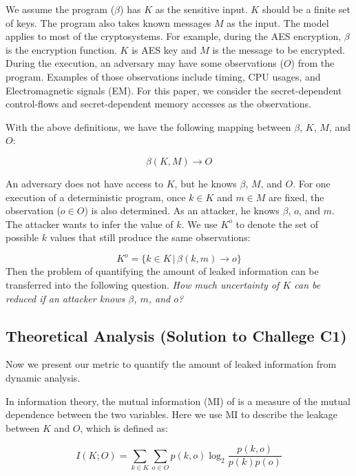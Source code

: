 We assume the program ($\beta$) has $K$ as the sensitive input. 
$K$ should be a finite set of keys. The program also takes known messages $M$ as the input. 
The model applies to most of the cryptosystems. For example,
during the AES encryption, $\beta$ is the encryption function. $K$ is AES key and
$M$ is the message to be encrypted. During the execution, an adversary may have some observations ($O$) from the program. Examples of those observations
include timing, CPU usages, and Electromagnetic signals (EM). For this paper, we
consider the secret-dependent control-flows and secret-dependent memory accesses
as the observations.

With the above definitions, we have the following mapping between $\beta$, $K$, $M$, and $O$:

\begin{displaymath}
    \beta(K, M) \rightarrow O
\end{displaymath}

An adversary does not have access to $K$, but he knows $\beta$, $M$, and $O$. 
For one execution of a deterministic program, once $k \in K$ and $m \in M$ are fixed, the 
observation ($o \in O$) is also determined. As an attacker, he knows $\beta$, $o$, 
and $m$. The attacker wants to infer the value of $k$. We use $K^o$ to denote the set of
possible $k$ values that still produce the same observations:

\begin{displaymath}
    K^o = \{ k \in K \, |\, \beta(k, m) \rightarrow o\}
\end{displaymath}
Then the problem of quantifying the amount of leaked information can be transferred into the
following question. 
\emph{How much uncertainty of $K$ can be reduced if an attacker knows $\beta$, $m$, and $o$?}
 
\subsection{Theoretical Analysis \textbf{(Solution to Challege C1)}}
Now we present our metric to quantify the amount of leaked 
information from dynamic analysis.

In information theory, the mutual information (MI) of is a measure of the mutual dependence 
between the two variables. Here we use MI to describe the leakage between $K$ and $O$, 
which is defined as:

\begin{equation} \label{eq:1}
    I(K;O) = \sum_{k {\in} K}{\sum_{o {\in} O}{p(k, o)\log_2\frac{p(k, o)}{p(k)p(o)}}}
\end{equation}

